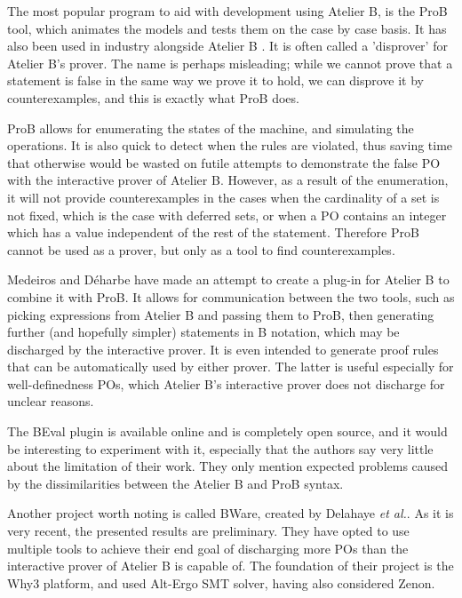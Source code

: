 \documentclass[11pt,journal]{IEEEtran}
\begin{document}
	The most popular program to aid with development using Atelier B, is the ProB tool, which animates the models and tests them on the case by case basis.\cite{ProB} It has also been used in industry alongside Atelier B \cite{San Juan metro}. It is often called a 'disprover' for Atelier B's prover. The name is perhaps misleading; while we cannot prove that a statement is false in the same way we prove it to hold, we can disprove it by counterexamples, and this is exactly what ProB does.
	
	ProB allows for enumerating the states of the machine, and simulating the operations. It is also quick to detect when the rules are violated, thus saving time that otherwise would be wasted on futile attempts to demonstrate the false PO with the interactive prover of Atelier B.\cite{Prob intro} However, as a result of the enumeration, it will not provide counterexamples in the cases when the cardinality of a set is not fixed, which is the case with deferred sets, or when a PO contains an integer which has a value independent of the rest of the statement. Therefore ProB cannot be used as a prover, but only as a tool to find counterexamples\cite{ProB for eventb}.
	
	Medeiros and D\'{e}harbe\cite{BEval} have made an attempt to create a plug-in for Atelier B to combine it with ProB. It allows for communication between the two tools, such as picking expressions from Atelier B and passing them to ProB, then generating further (and hopefully simpler) statements in B notation, which may be discharged by the interactive prover. It is even intended to generate proof rules that can be automatically used by either prover. The latter is useful especially for well-definedness POs, which Atelier B's interactive prover does not discharge for unclear reasons.
	
	The BEval plugin is available online and is completely open source, and it would be interesting to experiment with it, especially that the authors say very little about the limitation of their work. They only mention expected problems caused by the dissimilarities between the Atelier B and ProB syntax.
	
	Another project worth noting is called BWare, created by Delahaye \emph{et al.}.\cite{BWare} As it is very recent, the presented results are preliminary. They have opted to use multiple tools to achieve their end goal of discharging more POs than the interactive prover of Atelier B is capable of. The foundation of their project is the Why3 platform, and used Alt-Ergo SMT solver, having also considered Zenon.
\end{document}
